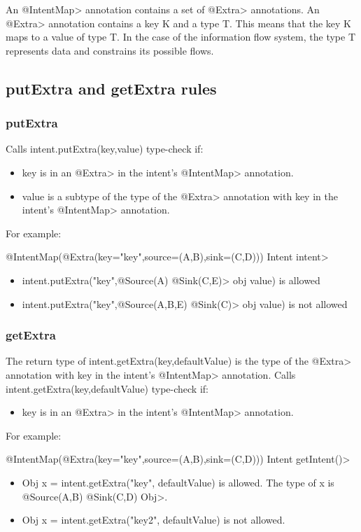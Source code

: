 An \<@IntentMap> annotation contains a set of \<@Extra> annotations. An
\<@Extra> annotation contains a key K and a type T. This means that the key K 
maps to a value of type T. In the case of the information flow system, the type T
represents data and constrains its possible flows. 

\subsection{putExtra and getExtra rules}

\subsubsection{putExtra}
Calls intent.putExtra(key,value) type-check if:
\begin{itemize}
\item
 key is in an \<@Extra> in the intent's \<@IntentMap> annotation.
\item
 value is a subtype of the type of the \<@Extra> annotation with key in the
	intent's \<@IntentMap> annotation. 


\end{itemize}
For example:

\<@IntentMap(@Extra(key="key",source=({A,B}),sink=({C,D})))
	Intent intent>
	
\begin{itemize}
\item
intent.putExtra("key",\<@Source({A}) @Sink({C,E})> obj value) is allowed
\item
intent.putExtra("key",\<@Source({A,B,E}) @Sink({C})> obj value) is not allowed

\end{itemize}

\subsubsection{getExtra}
The return type of intent.getExtra(key,defaultValue) is the type of the \<@Extra>
annotation with key in the intent's \<@IntentMap> annotation.
Calls intent.getExtra(key,defaultValue) type-check if:
\begin{itemize}
\item
key is in an \<@Extra> in the intent's \<@IntentMap> annotation.
\end{itemize}
For example:
		
\<@IntentMap(@Extra(key="key",source=({A,B}),sink=({C,D})))
		Intent getIntent()>
\begin{itemize}
\item
	Obj x = intent.getExtra("key", defaultValue) is allowed. 
	The type of x is \<@Source(A,B) @Sink(C,D) Obj>.
\item
	Obj x = intent.getExtra("key2", defaultValue) is not allowed.
\end{itemize}

